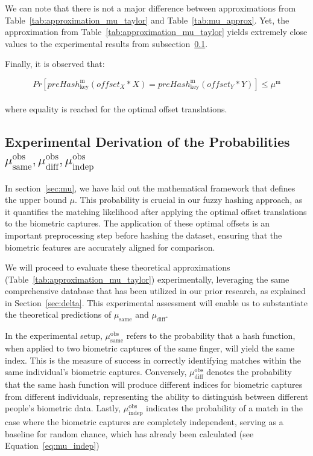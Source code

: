 We can note that there is not a major difference between approximations from Table~\ref{tab:approximation_mu_taylor} and Table~\ref{tab:mu_approx}. Yet, the approximation from Table~\ref{tab:approximation_mu_taylor} yields extremely close values to the experimental results from subsection~\ref{sec:experiment_fuzzy_hash}.

Finally, it is observed that:

\begin{equation}
    Pr[preHash_{\text{key}}^\text{m}(offset_X * X) = preHash_{\text{key}}^\text{m}(offset_Y * Y)] \leq \mu^{\text{m}}
\end{equation}
\\
where equality is reached for the optimal offset translations.

\subsection{Experimental Derivation of the Probabilities \(\mu_{\text{same}}^{\text{obs}}, \mu_{\text{diff}}^{\text{obs}}, \mu_{\text{indep}}^{\text{obs}}\)}
\label{sec:experiment_fuzzy_hash}

In section~\ref{sec:mu}, we have laid out the mathematical framework that defines the upper bound \(\mu\). This probability is crucial in our fuzzy hashing approach, as it quantifies the matching likelihood after applying the optimal offset translations to the biometric captures. The application of these optimal offsets is an important preprocessing step before hashing the dataset, ensuring that the biometric features are accurately aligned for comparison.

We will proceed to evaluate these theoretical approximations (Table~\ref{tab:approximation_mu_taylor}) experimentally, leveraging the same comprehensive database that has been utilized in our prior research, as explained in Section~\ref{sec:delta}. This experimental assessment will enable us to substantiate the theoretical predictions of \(\mu_{\text{same}}\) and \(\mu_{\text{diff}}\).

In the experimental setup, \(\mu^{\text{obs}}_{\text{same}}\) refers to the probability that a hash function, when applied to two biometric captures of the same finger, will yield the same index. This is the measure of success in correctly identifying matches within the same individual's biometric captures. Conversely, \(\mu^{\text{obs}}_{\text{diff}}\) denotes the probability that the same hash function will produce different indices for biometric captures from different individuals, representing the ability to distinguish between different people's biometric data. Lastly, \(\mu^{\text{obs}}_{\text{indep}}\) indicates the probability of a match in the case where the biometric captures are completely independent, serving as a baseline for random chance, which has already been calculated (see Equation~\ref{eq:mu_indep})

